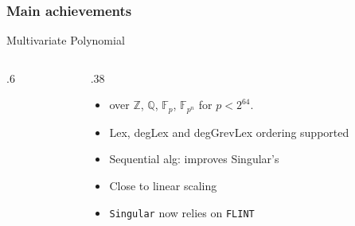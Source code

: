 \begin{frame}
\frametitle{Main achievements}


  \begin{block}{Multivariate Polynomial }
    \begin{columns}
      \begin{column}   {.6\textwidth}
        \vspace{1em}
        \noindent
        \only<1>{}
        \only<2>{}
        \only<3>{}
      \end{column}
      \begin{column}   {.38\textwidth}
        \begin{itemize}
     \item over $\mathbb{Z}$, $\mathbb{Q}$, $\mathbb{F}_p$, $\mathbb{F}_{p^n}$ for $p < 2^{64}$.
     \item Lex, degLex and degGrevLex ordering supported
       \item Sequential alg: improves Singular's
       \item Close to linear scaling
       \item \texttt{Singular} now relies on \texttt{FLINT}
        \end{itemize}
      \end{column}
    \end{columns}
  \end{block}

\end{frame}


